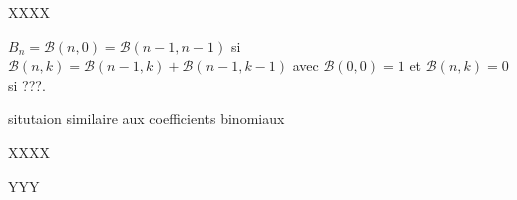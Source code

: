XXXX

$B_n = \mathcal{B}(n, 0) = \mathcal{B}(n-1, n-1)$
si
$\mathcal{B}(n, k) = \mathcal{B}(n-1, k) + \mathcal{B}(n-1, k-1)$
avec
$\mathcal{B}(0, 0) = 1$
et
$\mathcal{B}(n, k) = 0$
si ???.

situtaion similaire aux coefficients binomiaux 


XXXX


%
            {\bellintertree}{}


YYY

